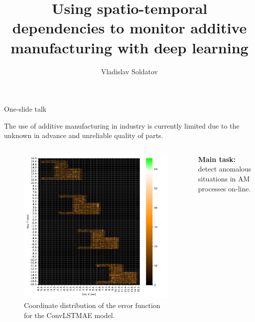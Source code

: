 \documentclass{beamer}
\title{Using spatio-temporal dependencies to monitor additive manufacturing with deep learning}
\author[V.\,D.~Soldatov]{Vladislav Soldatov}
\institute{Moscow State University}
\date{\footnotesize
\par\smallskip\emph{Course:} My first scientific paper
\par\smallskip\emph{Expert:} 
\par\smallskip\emph{Consultant:} 
\par\bigskip\small 2023}
\begin{document}
\begin{frame}{One-slide talk}

The use of additive manufacturing in industry is currently limited due to the unknown in advance and unreliable quality of parts.

\begin{columns}[c]

\begin{figure}
    \centering
    \includegraphics[scale=0.23]{lstm_4_window_xy_test_before.pdf}
    \caption{Coordinate distribution of the error function for the ConvLSTMAE model.}
    \label{fig:enter-label}
\end{figure}
    \textbf{Main task:} detect anomalous situations in AM processes on-line.


\end{columns}
\end{frame}
\end{document}
